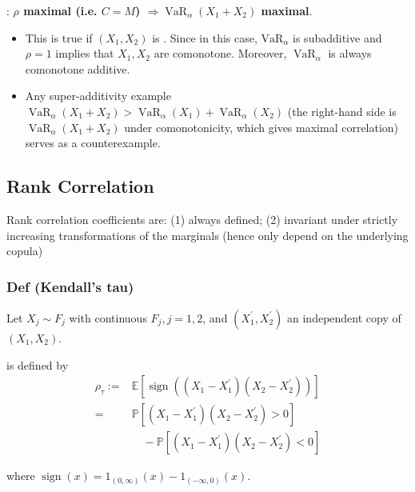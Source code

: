 : \textbf{$\rho$ maximal (i.e. $C=M$) $\Rightarrow \operatorname{VaR}_{\alpha}\left(X_{1}+X_{2}\right)$ maximal}.

\begin{itemize}[leftmargin=*]
    \item This is true if $\left(X_{1}, X_{2}\right)$ is . Since in this case, $\mathrm{VaR}_{\alpha}$ is subadditive and $\rho=1$ implies that $X_{1}, X_{2}$ are comonotone. Moreover, $\operatorname{VaR}_{\alpha}$ is always comonotone additive.
    \item Any super-additivity example $\operatorname{VaR}_{\alpha}\left(X_{1}+X_{2}\right)>\operatorname{VaR}_{\alpha}\left(X_{1}\right)+\operatorname{VaR}_{\alpha}\left(X_{2}\right)$ (the right-hand side is $\operatorname{VaR}_{\alpha}\left(X_{1}+X_{2}\right)$ under comonotonicity, which gives maximal correlation) serves as a counterexample.
\end{itemize}






\subsection*{Rank Correlation}
Rank correlation coefficients are: (1) always defined; (2) invariant under strictly increasing transformations of the marginals (hence only depend on the underlying copula)

\subsubsection*{Def (Kendall’s tau)}
Let $X_{j} \sim F_{j}$ with continuous $F_{j}, j=1,2$, and $\left(X_{1}^{\prime}, X_{2}^{\prime}\right)$ an independent copy of $\left(X_{1}, X_{2}\right)$. 

 is defined by
$$
\begin{aligned}
\rho_{\tau}:=&\mathbb{E}\left[\operatorname{sign}\left(\left(X_{1}-X_{1}^{\prime}\right)\left(X_{2}-X_{2}^{\prime}\right)\right)\right] \\
=& \mathbb{P}\left[\left(X_{1}-X_{1}^{\prime}\right)\left(X_{2}-X_{2}^{\prime}\right)>0\right] \\
& \quad -\mathbb{P}\left[\left(X_{1}-X_{1}^{\prime}\right)\left(X_{2}-X_{2}^{\prime}\right)<0\right]
\end{aligned}
$$

where $\operatorname{sign}(x)=1_{(0, \infty)}(x)-1_{(-\infty, 0)}(x)$.


